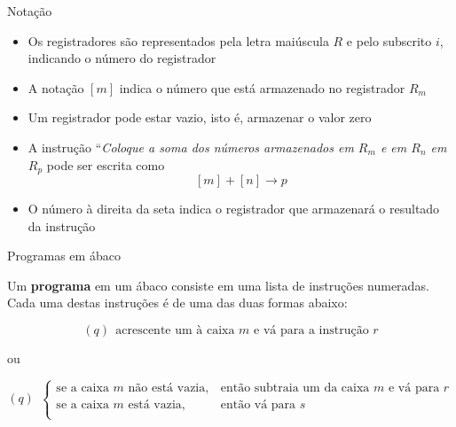 \begin{frame}[fragile]{Notação}

    \begin{itemize}
        \item Os registradores são representados pela letra maiúscula $R$ e pelo subscrito $i$,
            indicando o número do registrador

        \item A notação $[m]$ indica o número que está armazenado no registrador $R_m$

        \item Um registrador pode estar vazio, isto é, armazenar o valor zero

        \item A instrução ``{\it Coloque a soma dos números armazenados em $R_m$ e em $R_n$ em 
            $R_p$} pode ser escrita como
        \[
            [m] + [n] \to p
        \]

        \item O número à direita da seta indica o registrador que armazenará o resultado da
            instrução
    \end{itemize}

\end{frame}

\begin{frame}[fragile]{Programas em ábaco}

    Um \textbf{programa} em um ábaco consiste em uma lista de instruções numeradas. Cada
    uma destas instruções é de uma das duas formas abaixo:

    \begin{small}
    \vspace{0.2in}

    \[
        (q)\ \ \mbox{acrescente um à caixa $m$ e vá para a instrução $r$}
    \]
    \end{small}

    \vspace{0.1in}
    ou
    \vspace{0.1in}

    \begin{small}
    \[
        (q)\ \ \left\lbrace \begin{array}{ll}
            \mbox{se a caixa $m$ não está vazia},& \mbox{então subtraia um da caixa $m$ e vá para $r$}\\
            \mbox{se a caixa $m$ está vazia},& \mbox{então vá para $s$}\\
        \end{array}\right.
    \]
    \end{small}

\end{frame}

